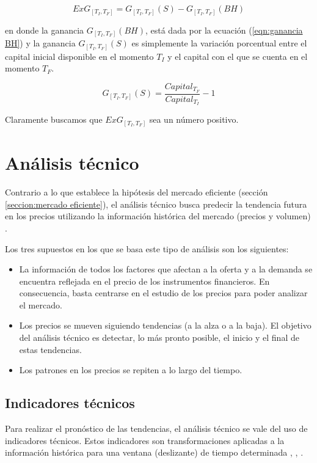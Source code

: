 \documentclass[12pt]{scrbook}
\theoremstyle{break}
\theoremstyle{break}
\begin{document}
\begin{equation} \label{eqn:Exceso de ganancia}
ExG_{\left[T_{I}, T_{F}\right]} = G_{\left[T_{I}, T_{F}\right]} (S) - G_{\left[T_{I}, T_{F}\right]} (BH)
\end{equation}

en donde la ganancia $G_{\left[T_{I}, T_{F}\right]} (BH)$, está dada por la ecuación (\ref{eqn:ganancia BH}) y la ganancia $G_{\left[T_{I}, T_{F}\right]} (S)$ es simplemente la variación porcentual entre el capital inicial disponible en el momento $T_{I}$ y el capital con el que se cuenta en el momento $T_{F}$.

\begin{equation} \label{eqn:Ganancia estrategia S}
G_{\left[T_{I}, T_{F}\right]}(S) = \dfrac{Capital_{T_F}}{Capital_{T_I} } - 1 
\end{equation}

Claramente buscamos que $ExG_{\left[T_{I}, T_{F}\right]}$ sea un número positivo.

\section{Análisis técnico}
\label{seccion:analisisTecnico}
Contrario a lo que establece la hipótesis del mercado eficiente (sección \ref{seccion:mercado eficiente}), el análisis técnico busca predecir la tendencia futura en los precios utilizando la información histórica del mercado (precios y volumen) \cite{murphy1999technical}.

Los tres supuestos en los que se basa este tipo de análisis son los siguientes:

\begin{itemize}
\item La información de todos los factores que afectan a la oferta y a la demanda se encuentra reflejada en el precio de los instrumentos financieros. En consecuencia, basta centrarse en el estudio de los precios para poder analizar el mercado.

\item Los precios se mueven siguiendo tendencias (a la alza o a la baja). El objetivo del análisis técnico es detectar, lo más pronto posible, el inicio y el final de estas tendencias.

\item Los patrones en los precios se repiten a lo largo del tiempo.
\end{itemize}


\subsection{Indicadores técnicos}
\label{subseccion:indicadores tecnicos}
Para realizar el pronóstico de las tendencias, el análisis técnico se vale del uso de indicadores técnicos. Estos indicadores son transformaciones aplicadas a la información histórica para una ventana (deslizante) de tiempo determinada \cite{murphy1999technical}, \cite{technicalAnalysisKirkPatrick}, \cite{encycoplediaTechnicalIndicators}.
\end{document}

